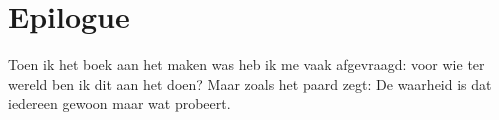 
\chapter*{Epilogue}
\label{epilogue}



\epigraph{Toen ik het boek aan het maken was heb ik me vaak afgevraagd: voor wie ter wereld ben ik dit aan het doen? Maar zoals het paard zegt: De waarheid is dat iedereen gewoon maar wat probeert.}{}

